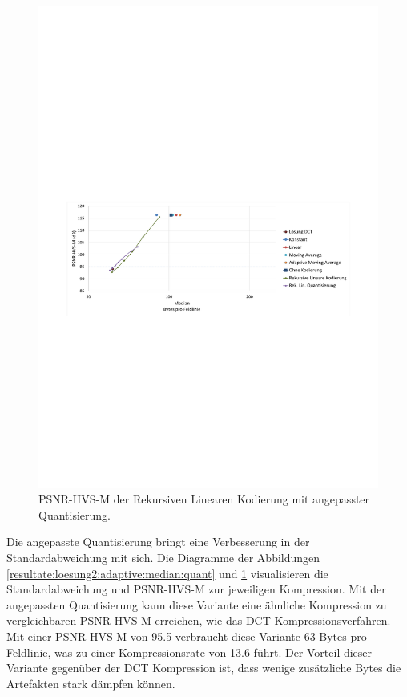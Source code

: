 \begin{figure}[!htbp]
\center
	\includegraphics[trim = 1.8cm 11cm 1.8cm 12.5cm, clip=true,width=1\textwidth,keepaspectratio]{./pictures/resultate/loesung2/variante3/resultate_psnr.pdf}
	\caption{PSNR-HVS-M der Rekursiven Linearen Kodierung mit angepasster Quantisierung.}
	\label{resultate:loesung2:adaptive:median:quant_psnr}
\end{figure}
Die angepasste Quantisierung bringt eine Verbesserung in der Standardabweichung mit sich. Die Diagramme der Abbildungen \ref{resultate:loesung2:adaptive:median:quant} und \ref{resultate:loesung2:adaptive:median:quant_psnr} visualisieren die Standardabweichung und PSNR-HVS-M zur jeweiligen Kompression. Mit der angepassten Quantisierung kann diese Variante eine ähnliche Kompression zu vergleichbaren PSNR-HVS-M erreichen, wie das DCT Kompressionsverfahren. Mit einer PSNR-HVS-M von 95.5 verbraucht diese Variante 63 Bytes pro Feldlinie, was zu einer Kompressionsrate von 13.6 führt. Der Vorteil dieser Variante gegenüber der DCT Kompression ist, dass wenige zusätzliche Bytes die Artefakten stark dämpfen können. 

